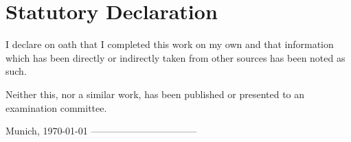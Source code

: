 \documentclass[document.tex]{subfiles}
\begin{document}
\clearpage\thispagestyle{empty}
\renewcommand{\thesection}{}
\section{Statutory Declaration}
I declare on oath that I completed this work on my own and that information which has been directly or indirectly taken from other sources has been noted as such.
 
Neither this, nor a similar work, has been published or presented to an examination committee. 
 
Munich, \today
\newline
\newline
\newline
\newline
\newline
---------------------------------\newline
\makeatletter \@author
\end{document}
